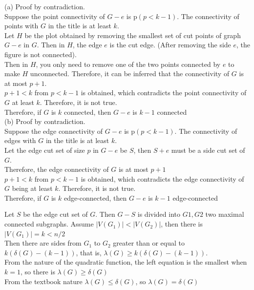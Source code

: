 \documentclass[a4paper, justified]{tufte-handout}
\begin{document}
\begin{solution}
  (a)
  Proof by contradiction.\\
  Suppose the point connectivity of $G-e$ is p$(p<k-1)$. The connectivity of points with $G$ in the title is at least $k$. \\
  Let $H$ be the plot obtained by removing the smallest set of cut points of graph $G-e$ in $G$. Then in $H$, the edge $e$ is the cut edge. (After removing the side $e$, the figure is not connected). \\
  Then in $H$, you only need to remove one of the two points connected by $e$ to make $H$ unconnected. Therefore, it can be inferred that the connectivity of $G$ is at most $p+1$. \\
  $p+1<k$ from $p<k-1$ is obtained, which contradicts the point connectivity of $G$ at least $k$. Therefore, it is not true.\\
  Therefore, if $G$ is $k$ connected, then $G-e$ is $k-1$ connected\\
  (b)
  Proof by contradiction. \\
  Suppose the edge connectivity of $G-e$ is p$(p<k-1)$. The connectivity of edges with $G$ in the title is at least $k$. \\
  Let the edge cut set of size $p$ in $G-e$ be $S$, then $S+e$ must be a side cut set of $G$. \\
  Therefore, the edge connectivity of $G$ is at most $p+1$\\
  $p+1<k$ from $p<k-1$ is obtained, which contradicts the edge connectivity of $G$ being at least $k$. Therefore, it is not true. \\
  Therefore, if $G$ is $k$ edge-connected, then $G-e$ is $k-1$ edge-connected
\end{solution}

\begin{problem}[CZ 5.26]
\end{problem}

\begin{solution}
  Let $S$ be the edge cut set of $G$. Then $G-S$ is divided into $G1, G2$ two maximal connected subgraphs. Assume $|V(G_1)|<|V(G_2)|$, then there is $|V(G_1)|=k<n/2$\\
  Then there are sides from $G_1$ to $G_2$ greater than or equal to $k(\delta(G)-(k-1))$, that is, $\lambda(G) \geq k(\delta(G)-(k-1))$. \\
  From the nature of the quadratic function, the left equation is the smallest when $k=1$, so there is $\lambda(G) \geq \delta(G)$\\
  From the textbook nature $\lambda(G) \leq \delta(G)$, so $\lambda(G) = \delta(G)$
\end{solution}
\end{document}
